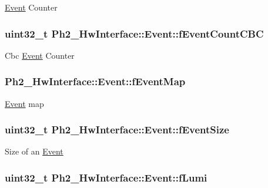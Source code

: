\hyperlink{class_ph2___hw_interface_1_1_event}{Event} Counter \hypertarget{class_ph2___hw_interface_1_1_event_ac61b0e2c53e5d4228d43132f470dfdac}{
\subsubsection[{f\-Event\-Count\-C\-B\-C}]{\setlength{\rightskip}{0pt plus 5cm}uint32\-\_\-t Ph2\-\_\-\-Hw\-Interface\-::\-Event\-::f\-Event\-Count\-C\-B\-C\hspace{0.3cm}{\ttfamily [private]}}}\label{class_ph2___hw_interface_1_1_event_ac61b0e2c53e5d4228d43132f470dfdac}
Cbc \hyperlink{class_ph2___hw_interface_1_1_event}{Event} Counter \hypertarget{class_ph2___hw_interface_1_1_event_ace9844f1fc14895f880ed111c705d392}{
\subsubsection[{f\-Event\-Map}]{ Ph2\-\_\-\-Hw\-Interface\-::\-Event\-::f\-Event\-Map\hspace{0.3cm}{\ttfamily [private]}}}\label{class_ph2___hw_interface_1_1_event_ace9844f1fc14895f880ed111c705d392}
\hyperlink{class_ph2___hw_interface_1_1_event}{Event} map \hypertarget{class_ph2___hw_interface_1_1_event_a0a12db10e67652851517cc65c8057667}{
\subsubsection[{f\-Event\-Size}]{\setlength{\rightskip}{0pt plus 5cm}uint32\-\_\-t Ph2\-\_\-\-Hw\-Interface\-::\-Event\-::f\-Event\-Size}}\label{class_ph2___hw_interface_1_1_event_a0a12db10e67652851517cc65c8057667}
Size of an \hyperlink{class_ph2___hw_interface_1_1_event}{Event} \hypertarget{class_ph2___hw_interface_1_1_event_a78afd0886560acf70ee6b982c5690e0a}{
\subsubsection[{f\-Lumi}]{\setlength{\rightskip}{0pt plus 5cm}uint32\-\_\-t Ph2\-\_\-\-Hw\-Interface\-::\-Event\-::f\-Lumi\hspace{0.3cm}{\ttfamily [private]}}}\label{class_ph2___hw_interface_1_1_event_a78afd0886560acf70ee6b982c5690e0a}
